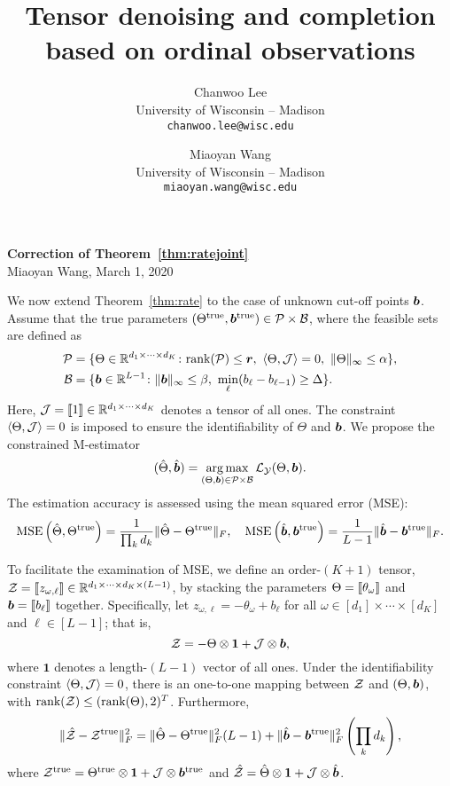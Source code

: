 \documentclass[11pt]{article}
\title{Tensor denoising and completion based on ordinal observations}
\date{}
\author{%
Chanwoo Lee \\
University of Wisconsin -- Madison\\
\texttt{chanwoo.lee@wisc.edu} \\
\and
Miaoyan Wang \\
University of Wisconsin -- Madison\\
\texttt{miaoyan.wang@wisc.edu} \\
}
\theoremstyle{plain}
\theoremstyle{definition}
\begin{document}
\begin{center}
{\bf \large Correction of Theorem~\ref{thm:ratejoint}}\\
Miaoyan Wang, March 1, 2020\\
\end{center}

We now extend Theorem~\ref{thm:rate} to the case of unknown cut-off points $\bm{b}$. Assume that the true parameters $(\Theta^{\mathrm{true}}, \bm{b}^{\mathrm{true}})\in \mathcal{P}\times \mathcal{B}$, where the feasible sets are defined as
\begin{align}
\tP&=\{\Theta\in\mathbb{R}^{d_1\times \cdots\times d_K}\colon \text{rank}(\tP)\leq \mr,\ \langle \Theta, \tJ \rangle=0,\ \mnormSize{}{\Theta}\leq \alpha\},\\
 \tB&=\{\mb\in\mathbb{R}^{L-1}\colon \mnormSize{}{\mb}\leq \beta,\ \min_{\ell}(b_\ell-b_{\ell-1}) \geq \Delta\}.
\end{align}
Here, $\mathcal{J}=\llbracket 1 \rrbracket\in\mathbb{R}^{d_1\times \cdots \times d_K}$ denotes a tensor of all ones. The constraint $\langle \Theta, \mathcal{J} \rangle=0$ is imposed to ensure the identifiability of $\Theta$ and $\bm{b}$. We propose the constrained M-estimator
\begin{equation}\label{eq:joint}
(\hat \Theta,\hat {\bm{b}})=\operatorname*{arg\,max}_{(\Theta,\bm{b})\in\mathcal{P}\times \mathcal{B}}\mathcal{L}_{\mathcal{Y}}(\Theta,\bm{b}).
\end{equation}
The estimation accuracy is assessed using the mean squared error (MSE):
\[
\text{MSE}\left( \hat \Theta, \Theta^{\mathrm{true}} \right)={1\over \prod_k d_k}\lVert\hat \Theta-\Theta^{\mathrm{true}}\rVert_F,\quad \text{MSE}\left( \hat {\bm{b}}, \bm{b}^{\mathrm{true}} \right)={1\over L-1}\lVert\hat {\bm{b}}-\bm{b}^{\mathrm{true}}\rVert_F.
\]

To facilitate the examination of MSE, we define an order-$(K+1)$ tensor, $\mathcal{Z}=\llbracket z_{\omega,\ell} \rrbracket\in\mathbb{R}^{d_1\times \cdots \times d_K\times (L-1)}$, by stacking the parameters $\Theta=\llbracket \theta_\omega \rrbracket$ and $\bm{b}=\llbracket b_\ell \rrbracket$ together. Specifically, let $z_{\omega,\ell}=-\theta_\omega+b_\ell$ for all $\omega\in[d_1]\times \cdots \times [d_K]$ and $\ell\in[L-1]$; that is,
\[
\mathcal{Z}=-\Theta\otimes \mathbf{1}+\mathcal{J}\otimes \bm{b},
\]
where $\mathbf{1}$ denotes a length-$(L-1)$ vector of all ones. Under the identifiability constraint $\langle \Theta, \mathcal{J} \rangle=0$, there is an one-to-one mapping between $\mathcal{Z}$ and $(\Theta, \bm{b})$, with $\text{rank}(\mathcal{Z})\leq (\text{rank}(\Theta),2)^T$. Furthermore, 
\begin{equation}\label{eq:decomp}
\lVert\hat {\mathcal{Z}}-\mathcal{Z}^{\mathrm{true}}\rVert_F^2=\lVert\hat \Theta-\Theta^{\mathrm{true}}\rVert_F^2 (L-1)+\lVert\hat {\bm{b}}-\bm{b}^{\mathrm{true}}\rVert_F^2 \left(\prod_kd_k\right),
\end{equation}
where $\mathcal{Z}^{\mathrm{true}}=\Theta^{\mathrm{true}}\otimes \mathbf{1}+\mathcal{J}\otimes \bm{b}^{\mathrm{true}}$ and $\hat {\mathcal{Z}}=\hat \Theta\otimes \mathbf{1}+\mathcal{J}\otimes \hat {\bm{b}}$. 
\end{document}
